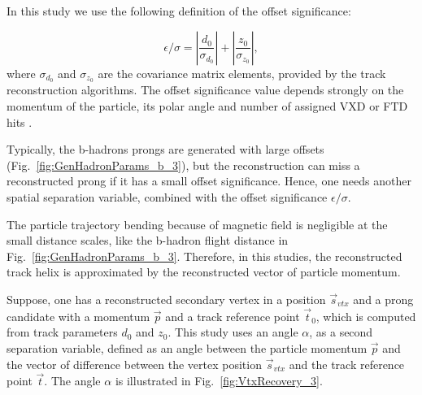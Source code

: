 % 


In this study we use the following definition of the offset significance:

\begin{equation}
	\epsilon/\sigma = |\frac{d_0}{\sigma_{d_0}}| + |\frac{z_0 }{ \sigma_{z_0}}|,
\end{equation}
where $\sigma_{d_{0}}$ and $\sigma_{z_0}$ are the covariance matrix elements, provided by the track reconstruction algorithms.
The offset significance value depends strongly on the momentum of the particle, its polar angle and number of assigned VXD or FTD hits . 

Typically, the b-hadrons prongs are generated with large offsets (Fig.~\ref{fig:GenHadronParams_b_3}), but the reconstruction can miss a reconstructed prong if it has a small offset significance. 
Hence, one needs another spatial separation variable, combined with the offset significance $\epsilon/\sigma$. 


The particle trajectory bending because of magnetic field is negligible at the small distance scales, like the b-hadron flight distance in Fig.~\ref{fig:GenHadronParams_b_3}. 
Therefore, in this studies, the reconstructed track helix is approximated by the reconstructed vector of particle momentum. 

Suppose, one has a reconstructed secondary vertex in a position $\vec{s}_{vtx}$ and a prong candidate with a momentum $\vec{p}$ and a track reference point $\vec{t}_0$, which is computed from track parameters $d_0$ and $z_0$.
This study uses an angle $\alpha$, as a second separation variable, defined as an angle between the particle momentum $\vec{p}$ and the vector of difference between the vertex position $\vec{s}_{vtx}$ and the track reference point $\vec{t}$. The angle $\alpha$ is illustrated in Fig.~\ref{fig:VtxRecovery_3}.

